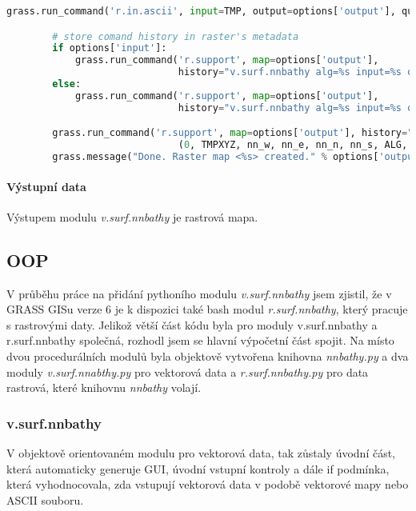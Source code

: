 \documentclass[12pt,a4paper]{article}
\begin{document}
\begin{lstlisting}[language=python, caption={python version}]
        grass.run_command('r.in.ascii', input=TMP, output=options['output'], quiet=True)

        # store comand history in raster's metadata
        if options['input']:
            grass.run_command('r.support', map=options['output'],
                              history="v.surf.nnbathy alg=%s input=%s output=%s" % (options['algorithm'], options['input'], options['output']))
        else:
            grass.run_command('r.support', map=options['output'],
                              history="v.surf.nnbathy alg=%s input=%s output=%s" % (options['algorithm'], options['file'], options['output']))

        grass.run_command('r.support', map=options['output'], history="\nnnbathy run syntax:\nnbathy -W %d -i %s -x '%d %d' -y '%d %d' -P %s -n %dx%d" % \
                              (0, TMPXYZ, nn_w, nn_e, nn_n, nn_s, ALG, cols,rows))
        grass.message("Done. Raster map <%s> created." % options['output'])
\end{lstlisting}

\paragraph{Výstupní data}
Výstupem modulu \textit{v.surf.nnbathy} je rastrová mapa.

\newpage
\subsection{OOP}
V průběhu práce na přidání pythoního modulu \textit{v.surf.nnbathy} jsem zjistil, že v GRASS GISu verze 6 je k dispozici také bash modul \textit{r.surf.nnbathy}, který pracuje s rastrovými daty. Jelikož větší část kódu byla pro moduly v.surf.nnbathy a r.surf.nnbathy společná, rozhodl jsem se hlavní výpočetní část spojit. Na místo dvou procedurálních modulů byla objektově vytvořena knihovna \textit{nnbathy.py} a dva moduly \textit{v.surf.nnabthy.py} pro vektorová data a \textit{r.surf.nnbathy.py} pro data rastrová, které knihovnu \textit{nnbathy} volají.

\subsubsection{v.surf.nnbathy}
V objektově orientovaném modulu pro vektorová data, tak zůstaly úvodní část, která automaticky generuje GUI, úvodní vstupní kontroly a dále if podmínka, která vyhodnocovala, zda vstupují vektorová data v podobě vektorové mapy nebo ASCII souboru.
\end{document}
